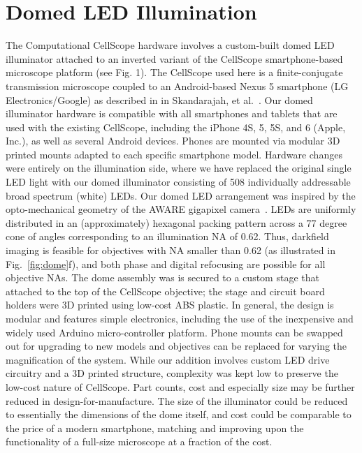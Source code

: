 \section{Domed LED Illumination}
The Computational CellScope hardware involves a custom-built domed LED illuminator attached to an inverted variant of the CellScope smartphone-based microscope platform (see Fig. 1). The CellScope used here is a finite-conjugate transmission microscope coupled to an Android-based Nexus 5 smartphone (LG Electronics/Google) as described in in Skandarajah, et al.~\cite{10.1371/journal.pone.0096906}. Our domed illuminator hardware is compatible with all smartphones and tablets that are used with the existing CellScope, including the iPhone 4S, 5, 5S, and 6 (Apple, Inc.), as well as several Android devices. Phones are mounted via modular 3D printed mounts adapted to each specific smartphone model. Hardware changes were entirely on the illumination side, where we have replaced the original single LED light with our domed illuminator consisting of 508 individually addressable broad spectrum (white) LEDs. Our domed LED arrangement was inspired by the opto-mechanical geometry of the AWARE gigapixel camera~\cite{brady2012multiscale}. LEDs are uniformly distributed in an (approximately) hexagonal packing pattern across a 77 degree cone of angles corresponding to an illumination NA of 0.62. Thus, darkfield imaging is feasible for objectives with NA smaller than 0.62 (as illustrated in Fig.~\ref{fig:dome}f), and both phase and digital refocusing are possible for all objective NAs. The dome assembly was is secured to a custom stage that attached to the top of the CellScope objective; the stage and circuit board holders were 3D printed using low-cost ABS plastic. In general, the design is modular and features simple electronics, including the use of the inexpensive and widely used Arduino micro-controller platform. Phone mounts can be swapped out for upgrading to new models and objectives can be replaced for varying the magnification of the system. While our addition involves custom LED drive circuitry and a 3D printed structure, complexity was kept low to preserve the low-cost nature of CellScope. Part counts, cost and especially size may be further reduced in design-for-manufacture. The size of the illuminator could be reduced to essentially the dimensions of the dome itself, and cost could be comparable to the price of a modern smartphone, matching and improving upon the functionality of a full-size microscope at a fraction of the cost.  

